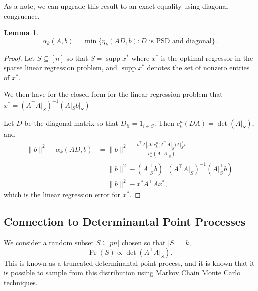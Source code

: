 \documentclass[a4paper]{article}
\newtheorem{lemma}{Lemma}
\DeclareMathOperator*{\supp}{supp}
\begin{document}
As a note, we can upgrade this result to an exact equality using diagonal congruence.
\begin{lemma}
\[\alpha_k(A, b) =  \min \{ \eta_k(AD, b) : {D \text{ is PSD and diagonal}}\}.\]
\end{lemma}
\begin{proof}
    Let $S \subseteq [n]$ so that $S = \supp x^*$ where $x^*$ is the optimal regressor in the sparse linear regression problem, and $\supp x^*$ denotes the set of nonzero entries of $x^*$. 

    We then have for the closed form for the linear regression problem that $x^* = (A^{\intercal}A|_S)^{-1}(A|_Sb|_S)$.

    Let $D$ be the diagonal matrix so that  $D_{ii} = 1_{i \in S}$. Then $c_k^n(DA) = \det(A|_S)$, and
    \begin{align*}
        \|b\|^2 - \alpha_k(AD, b) &= \|b\|^2 - \frac{b^{\intercal}A|_S\nabla c_k^n(A^{\intercal}A|_S) A|_S^{\intercal}b}{c_k^n(A^{\intercal}A|_S)}\\
                                                                                                                            &= \|b\|^2 - (A|_S^{\intercal}b)^{\intercal}(A^{\intercal}A|_S)^{-1} (A|_S^{\intercal}b)\\
                                                                                                                            &= \|b\|^2 - x^*A^{\intercal}Ax^*,
    \end{align*}
    which is the linear regression error for $x^*$.
\end{proof}
\subsection{Connection to Determinantal Point Processes}
We consider a random subset $S \subseteq pn[$ chosen so that $|S| = k$,
\[
    \Pr(S) \propto \det(A^{\intercal}A|_S).
\]
This is known as a truncated determinantal point process, and it is known that it is possible to sample from this distribution using Markov Chain Monte Carlo techniques.
\end{document}
